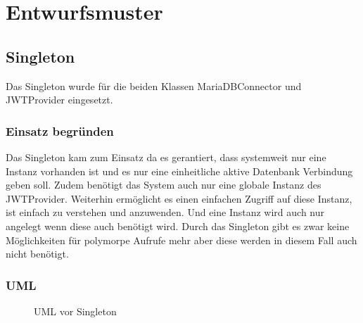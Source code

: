 \chapter{Entwurfsmuster}


\section{Singleton}

Das Singleton wurde für die beiden Klassen MariaDBConnector und JWTProvider eingesetzt.

\subsection{Einsatz begründen}

Das Singleton kam zum Einsatz da es gerantiert,
dass systemweit nur eine Instanz vorhanden ist und es nur eine einheitliche aktive Datenbank Verbindung geben soll.
Zudem benötigt das System auch nur eine globale Instanz des JWTProvider.
Weiterhin ermöglicht es einen einfachen Zugriff auf diese Instanz, ist einfach zu verstehen und anzuwenden.
Und eine Instanz wird auch nur angelegt wenn diese auch benötigt wird.
Durch das Singleton gibt es zwar keine Möglichkeiten für polymorpe Aufrufe mehr aber diese werden in diesem Fall auch nicht benötigt.


\subsection{UML}


\begin{figure}[htbp]
    \centering
    \caption{\label{1} UML vor Singleton}
\end{figure}

